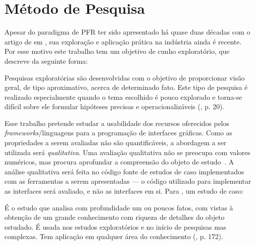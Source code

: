 \section{Método de Pesquisa}
\label{sec:metodo}

Apesar do paradigma de PFR ter sido apresentado há quase duas décadas com o
artigo de  em
\citeyear{Elliott-H:1997:Fran}, sua exploração e aplicação prática na indústria
ainda é recente. Por esse motivo este trabalho tem um objetivo de cunho
exploratório, que  descreve da seguinte forma:

\begin{citacao}
  Pesquisas exploratórias são desenvolvidas com o objetivo de proporcionar visão
  geral, de tipo aproximativo, acerca de determinado fato. Este tipo de pesquisa
  é realizado especialmente quando o tema escolhido é pouco explorado e torna-se
  difícil sobre ele formular hipóteses precisas e operacionalizáveis
  (\citeyear{gil2010metodos}, p. 20).
\end{citacao}

Esse trabalho pretende estudar a usabilidade dos recursos oferecidos pelos
\emph{frameworks}/linguagens para a programação de interfaces gráficas. Como as
propriedades a serem avaliadas não são quantificáveis, a abordagem a ser
utilizada será \emph{qualitativa}. Uma avaliação qualitativa não se preocupa com
valores numéricos, mas procura aprofundar a compreensão do objeto de
estudo~\cite[p.~31]{gerhardt2009metodos}. A análise qualitativa será feita no
código fonte de estudos de caso implementados com as ferramentas a serem
apresentadas --- o código utilizado para implementar as interfaces será avaliado,
e não as interfaces em si. Para , um estudo
de caso:

\begin{citacao}
  É o estudo que analisa com profundidade um ou poucos fatos, com vistas à
  obtenção de um grande conhecimento com riqueza de detalhes do objeto estudado.
  É usada nos estudos exploratórios e no início de pesquisas mas complexas. Tem
  aplicação em qualquer área do conhecimento (\citeyear{gil2010metodos}, p.
  172).
\end{citacao}

